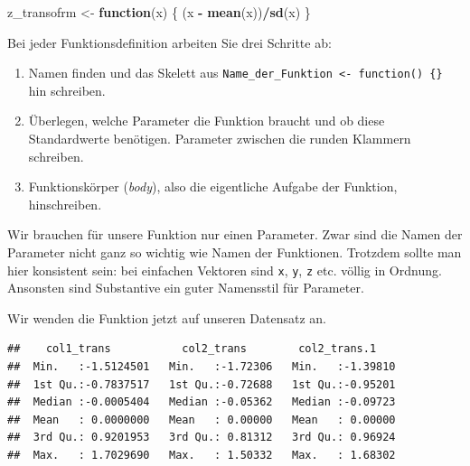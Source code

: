 \documentclass[]{book}
\newenvironment{Shaded}{\begin{snugshade}}{\end{snugshade}}
\newcommand{\ControlFlowTok}[1]{\textcolor[rgb]{0.13,0.29,0.53}{\textbf{#1}}}
\newcommand{\DataTypeTok}[1]{\textcolor[rgb]{0.13,0.29,0.53}{#1}}
\newcommand{\DecValTok}[1]{\textcolor[rgb]{0.00,0.00,0.81}{#1}}
\newcommand{\KeywordTok}[1]{\textcolor[rgb]{0.13,0.29,0.53}{\textbf{#1}}}
\newcommand{\NormalTok}[1]{#1}
\newcommand{\OperatorTok}[1]{\textcolor[rgb]{0.81,0.36,0.00}{\textbf{#1}}}
\newcommand{\StringTok}[1]{\textcolor[rgb]{0.31,0.60,0.02}{#1}}
\providecommand{\tightlist}{%
  \setlength{\itemsep}{0pt}\setlength{\parskip}{0pt}}
\begin{document}
\begin{Shaded}
\begin{Highlighting}[]
\NormalTok{z_transofrm <-}\StringTok{ }\ControlFlowTok{function}\NormalTok{(x) \{}
\NormalTok{  (x }\OperatorTok{-}\StringTok{ }\KeywordTok{mean}\NormalTok{(x))}\OperatorTok{/}\KeywordTok{sd}\NormalTok{(x)}
\NormalTok{\}}
\end{Highlighting}
\end{Shaded}

Bei jeder Funktionsdefinition arbeiten Sie drei Schritte ab:

\begin{enumerate}
\def\labelenumi{\arabic{enumi}.}
\tightlist
\item
  Namen finden und das Skelett aus \texttt{Name\_der\_Funktion\ \textless{}-\ function()\ \{\}} hin schreiben.
\item
  Überlegen, welche Parameter die Funktion braucht und ob diese Standardwerte benötigen. Parameter zwischen die runden Klammern schreiben.
\item
  Funktionskörper (\emph{body}), also die eigentliche Aufgabe der Funktion, hinschreiben.
\end{enumerate}

Wir brauchen für unsere Funktion nur einen Parameter. Zwar sind die Namen der Parameter nicht ganz so wichtig wie Namen der Funktionen. Trotzdem sollte man hier konsistent sein: bei einfachen Vektoren sind \texttt{x}, \texttt{y}, \texttt{z} etc. völlig in Ordnung. Ansonsten sind Substantive ein guter Namensstil für Parameter.

Wir wenden die Funktion jetzt auf unseren Datensatz an.

\begin{Shaded}
\end{Shaded}

\begin{verbatim}
##    col1_trans           col2_trans        col2_trans.1     
##  Min.   :-1.5124501   Min.   :-1.72306   Min.   :-1.39810  
##  1st Qu.:-0.7837517   1st Qu.:-0.72688   1st Qu.:-0.95201  
##  Median :-0.0005404   Median :-0.05362   Median :-0.09723  
##  Mean   : 0.0000000   Mean   : 0.00000   Mean   : 0.00000  
##  3rd Qu.: 0.9201953   3rd Qu.: 0.81312   3rd Qu.: 0.96924  
##  Max.   : 1.7029690   Max.   : 1.50332   Max.   : 1.68302
\end{verbatim}
\end{document}
